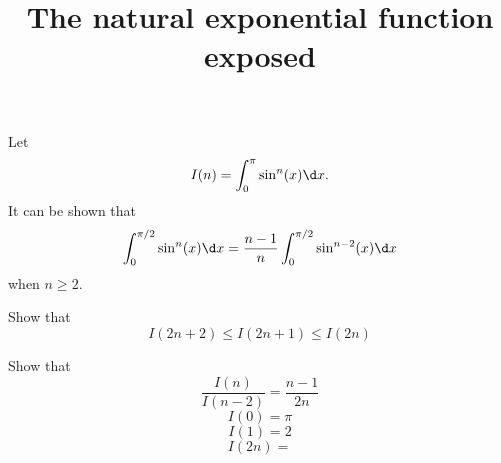 \documentclass{ximera}
\title[Dig-In:]{The natural exponential function exposed}
\begin{document}
\begin{abstract}
\end{abstract}
\maketitle

Let
\[
I(n) = \int_0^\pi \sin^n(x) \d x.
\]
It can be shown that
\[
\int_0^{\pi/2} \sin^n(x)\d x = \frac{n-1}{n} \int_0^{\pi/2} \sin^{n-2}(x) \d x
\]
when $n\ge 2$.

Show that
\[
I(2n+2) \le I(2n+1) \le I(2n)
\]

Show that
\[
\frac{I(n)}{I(n-2)} = \frac{n-1}{2n}
\]
\[
I(0) = \pi
\]
\[
I(1) = 2
\]
\[
I(2n) = 
\]
\end{document}
